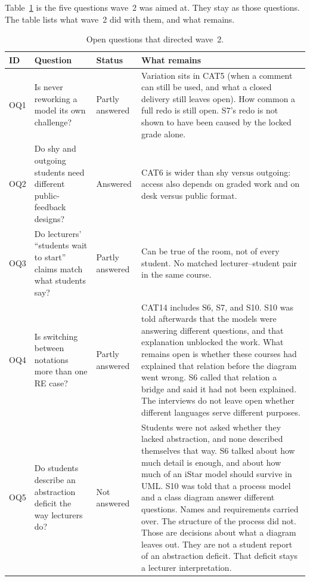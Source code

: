 Table~\ref{tab:open_questions} is the five questions wave~2 was aimed at. They stay as those questions. The table lists what wave~2 did with them, and what remains.

\begin{table}[H]
\centering
\footnotesize
\setlength{\tabcolsep}{3pt}
\caption{Open questions that directed wave~2.}
\label{tab:open_questions}
\begin{tabularx}{\textwidth}{l >{\raggedright\arraybackslash}p{} l >{\raggedright\arraybackslash}X}
\toprule
\textbf{ID} & \textbf{Question} & \textbf{Status} & \textbf{What remains} \\
\midrule
OQ1 & Is never reworking a model its own challenge? & Partly answered & Variation sits in CAT5 (when a comment can still be used, and what a closed delivery still leaves open). How common a full redo is still open. S7's redo is not shown to have been caused by the locked grade alone. \\
OQ2 & Do shy and outgoing students need different public-feedback designs? & Answered & CAT6 is wider than shy versus outgoing: access also depends on graded work and on desk versus public format. \\
OQ3 & Do lecturers' ``students wait to start'' claims match what students say? & Partly answered & Can be true of the room, not of every student. No matched lecturer--student pair in the same course. \\
OQ4 & Is switching between notations more than one RE case? & Partly answered & CAT14 includes S6, S7, and S10. S10 was told afterwards that the models were answering different questions, and that explanation unblocked the work. What remains open is whether these courses had explained that relation before the diagram went wrong. S6 called that relation a bridge and said it had not been explained. The interviews do not leave open whether different languages serve different purposes. \\
OQ5 & Do students describe an abstraction deficit the way lecturers do? & Not answered & Students were not asked whether they lacked abstraction, and none described themselves that way. S6 talked about how much detail is enough, and about how much of an iStar model should survive in UML. S10 was told that a process model and a class diagram answer different questions. Names and requirements carried over. The structure of the process did not. Those are decisions about what a diagram leaves out. They are not a student report of an abstraction deficit. That deficit stays a lecturer interpretation. \\
\bottomrule
\end{tabularx}
\end{table}

